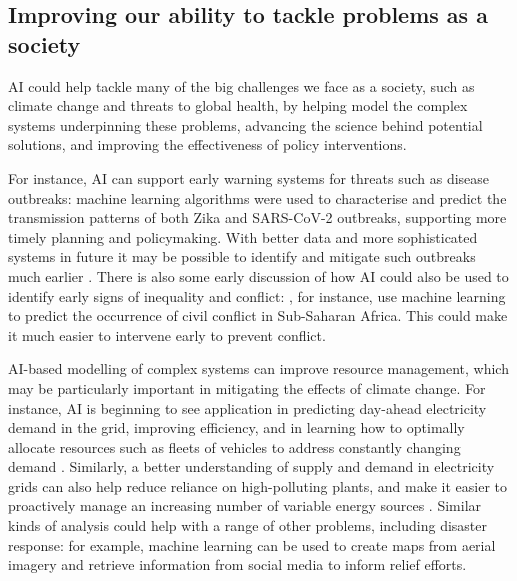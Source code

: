 \documentclass{article}
\begin{document}
\subsection{Improving our ability to tackle problems as a society}

AI could help tackle many of the big challenges we face as a society, such as climate change and threats to global health, by helping model the complex systems underpinning these problems, advancing the science behind potential solutions, and improving the effectiveness of policy interventions.

For instance, AI can support early warning systems for threats such as disease outbreaks: machine learning algorithms were used to characterise and predict the transmission patterns of both Zika \citep{jiang_mapping_2018} and SARS-CoV-2 \citep{wu_nowcasting_2020,liu_deployment_2020} outbreaks, supporting more timely planning and policymaking. With better data and more sophisticated systems in future it may be possible to identify and mitigate such outbreaks much earlier \citep{schwalbe_artificial_2020}. There is also some early discussion of how AI could also be used to identify early signs of inequality and conflict: \citet{musumba_prevention_2021}, for instance, use machine learning to predict the occurrence of civil conflict in Sub-Saharan Africa. This could make it much easier to intervene early to prevent conflict.

AI-based modelling of complex systems can improve resource management, which may be particularly important in mitigating the effects of climate change. For instance, AI is beginning to see application in predicting day-ahead electricity demand in the grid, improving efficiency, and in learning how to optimally allocate resources such as fleets of vehicles to address constantly changing demand \citep{hogarth_state_2019}. Similarly, a better understanding of supply and demand in electricity grids can also help reduce reliance on high-polluting plants, and make it easier to proactively manage an increasing number of variable energy sources \citep{rolnick_tackling_2019}. Similar kinds of analysis could help with a range of other problems, including disaster response: for example, machine learning can be used to create maps from aerial imagery and retrieve information from social media to inform relief efforts\citep{rolnick_tackling_2019}.
\end{document}
